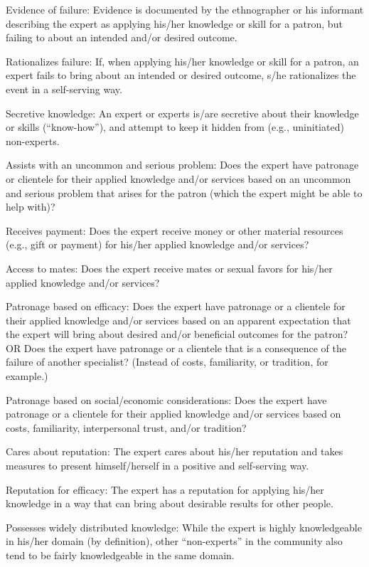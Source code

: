 \documentclass[
]{article}
\begin{document}
Evidence of failure: Evidence is documented by the ethnographer or his informant describing the expert as applying his/her knowledge or skill for a patron, but failing to about an intended and/or desired outcome.

Rationalizes failure: If, when applying his/her knowledge or skill for a patron, an expert fails to bring about an intended or desired outcome, s/he rationalizes the event in a self-serving way.

Secretive knowledge: An expert or experts is/are secretive about their knowledge or skills (``know-how''), and attempt to keep it hidden from (e.g., uninitiated) non-experts.

Assists with an uncommon and serious problem: Does the expert have patronage or clientele for their applied knowledge and/or services based on an uncommon and serious problem that arises for the patron (which the expert might be able to help with)?

Receives payment: Does the expert receive money or other material resources (e.g., gift or payment) for his/her applied knowledge and/or services?

Access to mates: Does the expert receive mates or sexual favors for his/her applied knowledge and/or services?

Patronage based on efficacy: Does the expert have patronage or a clientele for their applied knowledge and/or services based on an apparent expectation that the expert will bring about desired and/or beneficial outcomes for the patron? OR Does the expert have patronage or a clientele that is a consequence of the failure of another specialist? (Instead of costs, familiarity, or tradition, for example.)

Patronage based on social/economic considerations: Does the expert have patronage or a clientele for their applied knowledge and/or services based on costs, familiarity, interpersonal trust, and/or tradition?

Cares about reputation: The expert cares about his/her reputation and takes measures to present himself/herself in a positive and self-serving way.

Reputation for efficacy: The expert has a reputation for applying his/her knowledge in a way that can bring about desirable results for other people.

Possesses widely distributed knowledge: While the expert is highly knowledgeable in his/her domain (by definition), other ``non-experts'' in the community also tend to be fairly knowledgeable in the same domain.
\end{document}
